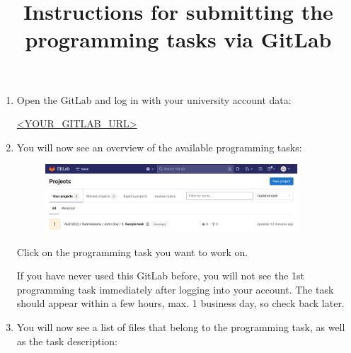 \documentclass{scrartcl}
\title{\vspace{-2cm}Instructions for submitting the programming tasks via GitLab}
\begin{document}
	\maketitle
	
	\begin{enumerate}
		\item Open the GitLab and log in with your university account data:
		
		\vfill
		
		\url{<YOUR_GITLAB_URL>} %
		
		\vfill
	
		\item You will now see an overview of the available programming tasks:
		
		\vfill
		
		\begin{figure}[h!]
			\centering
			\includegraphics[width=0.9\textwidth]{img/en/screenshot-project-overview.png}
		\end{figure}
		
		\vfill

		Click on the programming task you want to work on.
		
		\vfill

		\begin{tcolorbox}[title=\faLightbulbO\space Hint,colbacktitle=hintboxcolor,colframe=hintboxcolor]
			If you have never used this GitLab before, you will not see the 1st programming task immediately after logging into your account. The task should appear within a few hours, max. 1 business day, so check back later.
		\end{tcolorbox}
		
		\vspace{6cm}
		
		\newpage
		
		\item You will now see a list of files that belong to the programming task, as well as the task description:
		
		\vfill
		

\end{enumerate}
\end{document}
